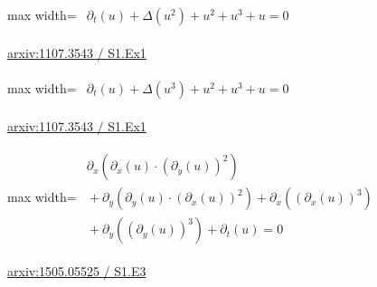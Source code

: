 \documentclass[10pt,a4paper]{article}
\begin{document}
\begin{minipage}{\linewidth}
\begin{center}\begin{adjustbox}{max width=\linewidth}$\displaystyle\begin{gathered}\begin{gathered}\partial_{t}(u)+\Delta(u^{2})+u^{2}+u^{3}+u=0\end{gathered}\end{gathered}$\end{adjustbox}\end{center}
{\small \href{https://arxiv.org/html/1107.3543#S1.Ex1}{arxiv:1107.3543 / S1.Ex1}}\par
\end{minipage}\par\vspace{7mm}

\begin{minipage}{\linewidth}
\begin{center}\begin{adjustbox}{max width=\linewidth}$\displaystyle\begin{gathered}\begin{gathered}\partial_{t}(u)+\Delta(u^{3})+u^{2}+u^{3}+u=0\end{gathered}\end{gathered}$\end{adjustbox}\end{center}
{\small \href{https://arxiv.org/html/1107.3543#S1.Ex1}{arxiv:1107.3543 / S1.Ex1}}\par
\end{minipage}\par\vspace{7mm}

\begin{minipage}{\linewidth}
\begin{center}\begin{adjustbox}{max width=\linewidth}$\displaystyle\begin{gathered}\begin{gathered}\partial_{x}(\partial_{x}(u)\cdot (\partial_{y}(u))^{2})\\[-1pt]{}+\partial_{y}(\partial_{y}(u)\cdot (\partial_{x}(u))^{2})+\partial_{x}((\partial_{x}(u))^{3})\\[-1pt]{}+\partial_{y}((\partial_{y}(u))^{3})+\partial_{t}(u)=0\end{gathered}\end{gathered}$\end{adjustbox}\end{center}
{\small \href{https://arxiv.org/html/1505.05525#S1.E3}{arxiv:1505.05525 / S1.E3}}\par
\end{minipage}\par\vspace{7mm}
\end{document}
